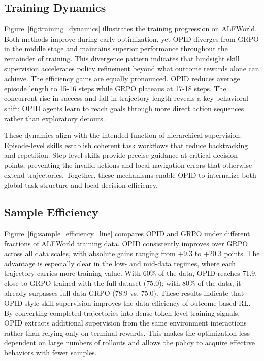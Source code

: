 \documentclass{llmxive}
\begin{document}
\subsection{Training Dynamics}
Figure~\ref{fig:training_dynamics} illustrates the training progression on ALFWorld. Both methods improve during early optimization, yet OPID diverges from GRPO in the middle stage and maintains superior performance throughout the remainder of training. This divergence pattern indicates that hindsight skill supervision accelerates policy refinement beyond what outcome rewards alone can achieve. The efficiency gains are equally pronounced. OPID reduces average episode length to 15-16 steps while GRPO plateaus at 17-18 steps. The concurrent rise in success and fall in trajectory length reveals a key behavioral shift: OPID agents learn to reach goals through more direct action sequences rather than exploratory detours.

These dynamics align with the intended function of hierarchical supervision. Episode-level skills establish coherent task workflows that reduce backtracking and repetition. Step-level skills provide precise guidance at critical decision points, preventing the invalid actions and local navigation errors that otherwise extend trajectories. Together, these mechanisms enable OPID to internalize both global task structure and local decision efficiency.

\subsection{Sample Efficiency}\label{subsec33_efficiency_analysis}
Figure~\ref{fig:sample_efficiency_line} compares OPID and GRPO under different fractions of ALFWorld training data. OPID consistently improves over GRPO across all data scales, with absolute gains ranging from +9.3 to +20.3 points. The advantage is especially clear in the low- and mid-data regimes, where each trajectory carries more training value. With 60\% of the data, OPID reaches 71.9, close to GRPO trained with the full dataset (75.0); with 80\% of the data, it already surpasses full-data GRPO (78.9 vs. 75.0). These results indicate that OPID-style skill supervision improves the data efficiency of outcome-based RL. By converting completed trajectories into dense token-level training signals, OPID extracts additional supervision from the same environment interactions rather than relying only on terminal rewards. This makes the optimization less dependent on large numbers of rollouts and allows the policy to acquire effective behaviors with fewer samples.
\end{document}
